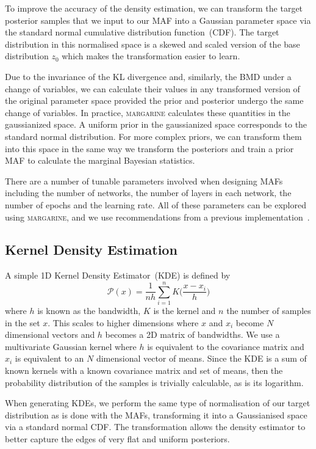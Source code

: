 To improve the accuracy of the density estimation, we can transform the target posterior samples that we input to our MAF into a Gaussian parameter space via the standard normal cumulative distribution function~(CDF). The target distribution in this normalised space is a skewed and scaled version of the base distribution $z_0$ which makes the transformation easier to learn.

Due to the invariance of the KL divergence and, similarly, the BMD under a change of variables, we can calculate their values in any transformed version of the original parameter space provided the prior and posterior undergo the same change of variables. In practice, \textsc{margarine} calculates these quantities in the gaussianized space. A uniform prior in the gaussianized space corresponds to the standard normal distribution. For more complex priors, we can transform them into this space in the same way we transform the posteriors and train a prior MAF to calculate the marginal Bayesian statistics.

There are a number of tunable parameters involved when designing MAFs including the number of networks, the number of layers in each network, the number of epochs and the learning rate. All of these parameters can be explored using \textsc{margarine}, and we use recommendations from a previous implementation~\cite{Alsing_bijectors_2021}.

\subsection{Kernel Density Estimation}

A simple 1D Kernel Density Estimator~(KDE) is defined by
\begin{equation}
    \mathcal{P}(x) = \frac{1}{nh}\sum_{i=1}^n K\bigg(\frac{x-x_i}{h}\bigg)
    \label{eq:gauss_kde}
\end{equation}
where $h$ is known as the bandwidth, $K$ is the kernel and $n$ the number of samples in the set $x$. This scales to higher dimensions where $x$ and $x_i$ become $N$ dimensional vectors and $h$ becomes a 2D matrix of bandwidths. We use a multivariate Gaussian kernel where $h$ is equivalent to the covariance matrix and $x_i$ is equivalent to an $N$ dimensional vector of means. Since the KDE is a sum of known kernels with a known covariance matrix and set of means, then the probability distribution of the samples is trivially calculable, as is its logarithm.

When generating KDEs, we perform the same type of normalisation of our target distribution as is done with the MAFs, transforming it into a Gaussianised space via a standard normal CDF. The transformation allows the density estimator to better capture the edges of very flat and uniform posteriors.

